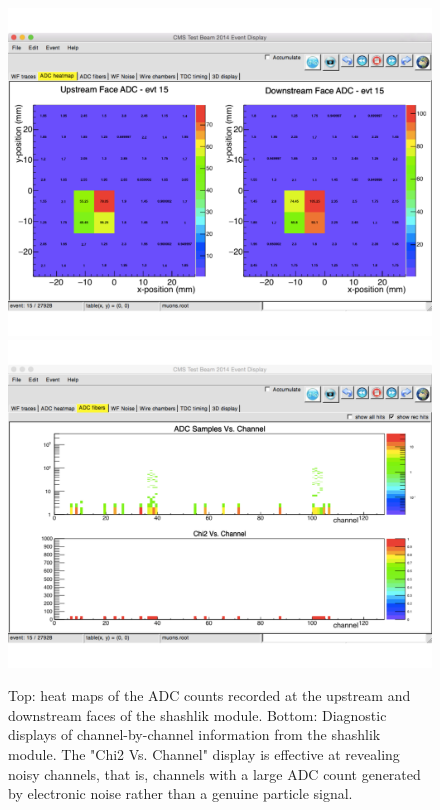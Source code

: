 \begin{figure}[h]\centering
\includegraphics[width=0.7\linewidth]{figures/CMS/Upgrade/MuonHeatMap.pdf}\\
\vspace{-1cm}
\includegraphics[width=0.7\linewidth]{figures/CMS/Upgrade/HealthyPulses.pdf}
\caption{Top: heat maps of the ADC counts recorded at the upstream and downstream faces of the shashlik module. Bottom: Diagnostic displays of channel-by-channel information from the shashlik module. The "Chi2 Vs. Channel" display is effective at revealing noisy channels, that is, channels with a large ADC count generated by electronic noise rather than a genuine particle signal.}
\label{fig:HeatMaps}
\end{figure}
